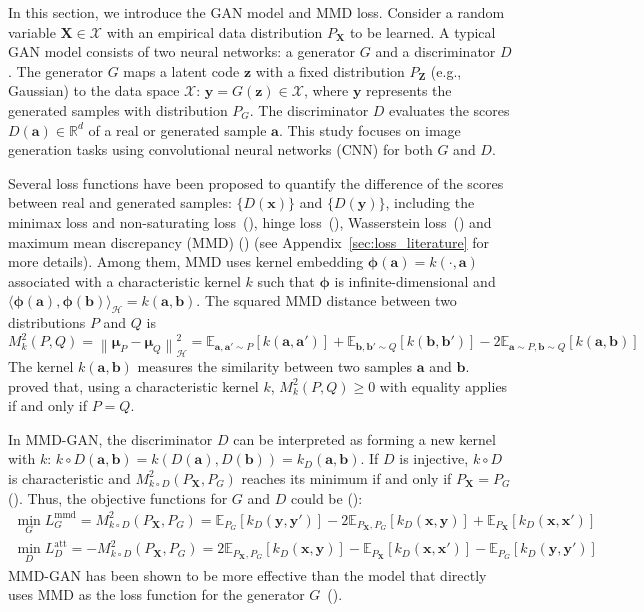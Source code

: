 \documentclass{article} %
\theoremstyle{plain}
\newtheorem*{proposition 1*}{Proposition 1}
\newcommand\norm[1]{\left\lVert#1\right\rVert}
\newcommand{\ds}[1]{\mathcal{#1}}  %
\newcommand{\set}[1]{\mathbb{#1}}  %
\newcommand{\rdv}[1]{\mathbf{#1}}  %
\begin{document}
In this section, we introduce the GAN model and MMD loss. Consider a random variable \(\rdv{X}\in\ds{X}\) with an empirical data distribution \(P_{\rdv{X}}\) to be learned. A typical GAN model consists of two neural networks: a generator \(G\) and a discriminator \(D\). The generator \(G\) maps a latent code \(\bm{z}\) with a fixed distribution \(P_{\rdv{Z}}\) (e.g., Gaussian) to the data space \(\ds{X}\): \(\bm{y}=G(\bm{z})\in\ds{X}\), where \(\bm{y}\) represents the generated samples with distribution \(P_{G}\). The discriminator \(D\) evaluates the scores \(D(\bm{a})\in\set{R}^d\) of a real or generated sample \(\bm{a}\). This study focuses on image generation tasks using convolutional neural networks (CNN) for both \(G\) and \(D\).

Several loss functions have been proposed to quantify the difference of the scores between real and generated samples: \(\{D(\bm{x})\}\) and \(\{D(\bm{y})\}\), including the minimax loss and non-saturating loss~(\cite{gan}), hinge loss~(\cite{implicit}), Wasserstein loss~(\cite{wgan,wgan_gp}) and maximum mean discrepancy (MMD) (\cite{mmd_gan_g,mmd_gan_t}) (see Appendix~\ref{sec:loss_literature} for more details). Among them, MMD uses kernel embedding \(\bm{\phi}(\bm{a})=k(\cdot,\bm{a})\) associated with a characteristic kernel \(k\) such that \(\bm{\phi}\) is infinite-dimensional and \(\langle\bm{\phi}(\bm{a}),\bm{\phi}(\bm{b})\rangle_{\ds{H}}=k(\bm{a},\bm{b})\). The squared MMD distance between two distributions \(P\) and \(Q\) is
\begin{equation}\label{Eq:mmd}
M_k^2(P,Q)=\norm{\bm{\mu}_{P}-\bm{\mu}_{Q}}_{\ds{H}}^2=\set{E}_{\bm{a},\bm{a}'\sim P}[k(\bm{a},\bm{a}')]+\set{E}_{\bm{b},\bm{b}'\sim Q}[k(\bm{b},\bm{b}')]-2\set{E}_{\bm{a}\sim P,\bm{b}\sim Q}[k(\bm{a},\bm{b})]
\end{equation}
The kernel \(k(\bm{a},\bm{b})\) measures the similarity between two samples \(\bm{a}\) and \(\bm{b}\). \cite{mmdtest} proved that, using a characteristic kernel \(k\), \(M_k^2(P,Q)\ge0\) with equality applies if and only if \(P=Q\). 

In MMD-GAN, the discriminator \(D\) can be interpreted as forming a new kernel with \(k\): \(k\circ D(\bm{a},\bm{b})=k(D(\bm{a}), D(\bm{b}))=k_D(\bm{a},\bm{b})\). If \(D\) is injective, \(k\circ D\) is characteristic and \(M_{k\circ D}^2(P_{\rdv{X}},P_{G})\) reaches its minimum if and only if \(P_{\rdv{X}}=P_{G}\) (\cite{mmd_gan_g}). Thus, the objective functions for \(G\) and \(D\) could be (\cite{mmd_gan_g,mmd_gan_t}):
\begin{gather}
\min_{G}L_{G}^{\text{mmd}}=M_{k\circ D}^2(P_{\rdv{X}},P_{G})=\set{E}_{P_G}[k_D(\bm{y},\bm{y}')]-2\set{E}_{P_{\rdv{X}},P_{G}}[k_D(\bm{x},\bm{y})]+\set{E}_{P_{\rdv{X}}}[k_D(\bm{x},\bm{x}')] \label{eq:L_G} \\
\min_{D}L_D^{\text{att}}=-M_{k\circ D}^2(P_{\rdv{X}},P_{G})=2\set{E}_{P_{\rdv{X}},P_{G}}[k_D(\bm{x},\bm{y})]-\set{E}_{P_{\rdv{X}}}[k_D(\bm{x},\bm{x}')]-\set{E}_{P_G}[k_D(\bm{y},\bm{y}')] \label{eq:L_D}
\end{gather}
MMD-GAN has been shown to be more effective than the model that directly uses MMD as the loss function for the generator \(G\)~(\cite{mmd_gan_g}). 
\end{document}
